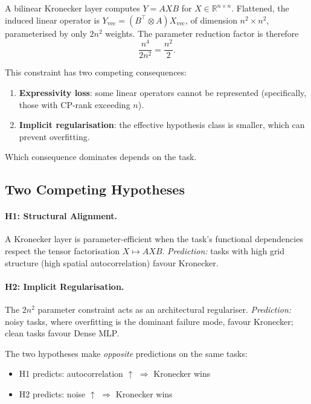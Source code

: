 \documentclass[11pt,a4paper]{article}
\begin{document}
A bilinear Kronecker layer computes $Y = A X B$ for
$X \in \mathbb{R}^{n \times n}$. Flattened, the induced linear
operator is $Y_{\text{vec}} = (B^\top \otimes A) X_{\text{vec}}$,
of dimension $n^2 \times n^2$, parameterised by only $2n^2$
weights. The parameter reduction factor is therefore
\begin{equation}
\frac{n^4}{2n^2} = \frac{n^2}{2}.
\label{eq:reduction}
\end{equation}

This constraint has two competing consequences:
\begin{enumerate}
\item \textbf{Expressivity loss}: some linear operators cannot be
represented (specifically, those with CP-rank exceeding $n$).
\item \textbf{Implicit regularisation}: the effective hypothesis
class is smaller, which can prevent overfitting.
\end{enumerate}

Which consequence dominates depends on the task.

\subsection{Two Competing Hypotheses}
\label{sec:hypotheses}

\paragraph{H1: Structural Alignment.}
A Kronecker layer is parameter-efficient when the task's functional
dependencies respect the tensor factorisation $X \mapsto AXB$.
\emph{Prediction:} tasks with high grid structure (high spatial
autocorrelation) favour Kronecker.

\paragraph{H2: Implicit Regularisation.}
The $2n^2$ parameter constraint acts as an architectural
regulariser. \emph{Prediction:} noisy tasks, where overfitting is
the dominant failure mode, favour Kronecker; clean tasks favour
Dense MLP.

The two hypotheses make \emph{opposite} predictions on the same
tasks:
\begin{itemize}
\item H1 predicts: autocorrelation $\uparrow$ $\Rightarrow$
      Kronecker wins
\item H2 predicts: noise $\uparrow$ $\Rightarrow$ Kronecker wins
\end{itemize}
\end{document}
